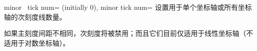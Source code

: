 \begin{pgfplotsxykeylist}{%
    minor \x\ tick num= (initially 0),
    minor tick num=%
}
    设置用于单个坐标轴或所有坐标轴的次刻度线数量。

    如果主刻度间距不相同，次刻度将被禁用；而且它们目前仅适用于线性坐标轴（不适用于对数坐标轴）。
\begin{codeexample}[]
\end{codeexample}

\begin{codeexample}[]
\end{codeexample}

\begin{codeexample}[]
\end{codeexample}
\end{pgfplotsxykeylist}

